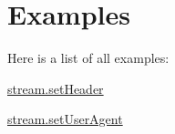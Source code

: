 \section{Examples}
Here is a list of all examples\+:\begin{DoxyCompactItemize}
\item 
\mbox{\hyperlink{stream_8setHeader-example}{stream.\+set\+Header}}
\item 
\mbox{\hyperlink{stream_8setUserAgent-example}{stream.\+set\+User\+Agent}}
\end{DoxyCompactItemize}
